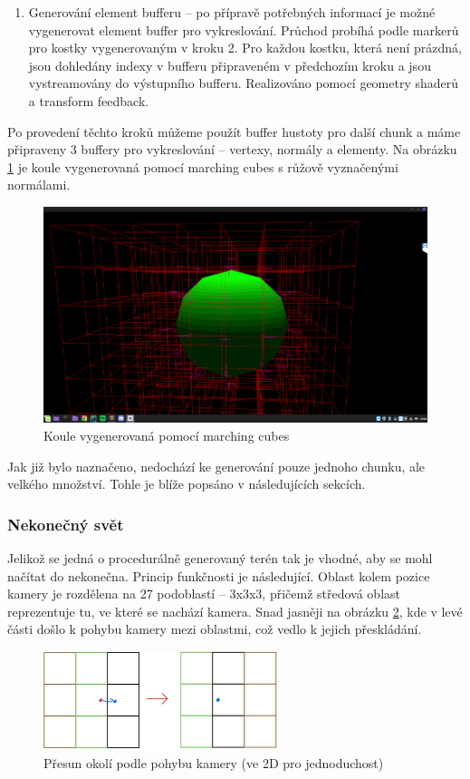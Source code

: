 \documentclass[12pt,a4paper,titlepage,final]{report}
\begin{document}
\begin{enumerate}
    \item Generování element bufferu -- po přípravě potřebných informací je možné vygenerovat element buffer pro vykreslování. Průchod probíhá podle markerů pro kostky vygenerovaným v kroku 2. Pro každou kostku, která není prázdná, jsou dohledány indexy v bufferu připraveném v předchozím kroku a jsou vystreamovány do výstupního bufferu. Realizováno pomocí geometry shaderů a transform feedback.
\end{enumerate}

Po provedení těchto kroků můžeme použít buffer hustoty pro další chunk a máme připraveny 3 buffery pro vykreslování -- vertexy, normály a elementy. Na obrázku \ref{fig:sphere} je koule vygenerovaná pomocí marching cubes s růžově vyznačenými normálami.

\begin{figure}[H]
    \centering
    \includegraphics[scale=1]{images/sphere.png}
    \caption{Koule vygenerovaná pomocí marching cubes}
    \label{fig:sphere}
\end{figure}

Jak již bylo naznačeno, nedochází ke generování pouze jednoho chunku, ale velkého množství. Tohle je blíže popsáno v následujících sekcích.

\subsubsection{Nekonečný svět}
Jelikož se jedná o procedurálně generovaný terén tak je vhodné, aby se mohl načítat do nekonečna. Princip funkčnosti je následující. Oblast kolem pozice kamery je rozdělena na 27 podoblastí -- 3x3x3, přičemž středová oblast reprezentuje tu, ve které se nachází kamera. Snad jasněji na obrázku \ref{fig:surr}, kde v levé části došlo k pohybu kamery mezi oblastmi, což vedlo k jejich přeskládání.

\begin{figure}[H]
    \centering
    \includegraphics[scale=1]{images/surr.jpg}
    \caption{Přesun okolí podle pohybu kamery (ve 2D pro jednoduchost)}
    \label{fig:surr}
\end{figure}
\end{document}
